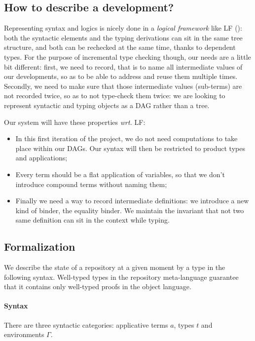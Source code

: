 \documentclass{article}
\begin{document}
\subsection{How to describe a development?}

Representing syntax and logics is nicely done in a \emph{logical
  framework} like LF (\cite{harper1993framework}): both the syntactic
elements and the typing derivations can sit in the same tree
structure, and both can be rechecked at the same time, thanks to
dependent types. For the purpose of incremental type checking though,
our needs are a little bit different: first, we need to record, that
is to name all intermediate values of our developments, so as to be
able to address and reuse them multiple times. Secondly, we need to
make sure that those intermediate values (sub-terms) are not recorded
twice, so as to not type-check them twice: we are looking to represent
syntactic and typing objects as a DAG rather than a tree.

Our system will have these properties \emph{wrt.} LF:
\begin{itemize}
\item In this first iteration of the project, we do not need
  computations to take place within our DAGs. Our syntax will then be
  restricted to product types and applications;
\item Every term should be a flat application of variables, so that we
  don't introduce compound terms without naming them;
\item Finally we need a way to record intermediate definitions: we
  introduce a new kind of binder, the equality binder. We maintain the
  invariant that not two same definition can sit in the context while
  typing.
\end{itemize}

\subsection{Formalization}

We describe the state of a repository at a given moment by a type in
the following syntax. Well-typed types in the repository meta-language
guarantee that it contains only well-typed proofs in the object
language.

\paragraph{Syntax} There are three syntactic categories: applicative
terms $a$, types $t$ and environments $\Gamma$.
\end{document}
